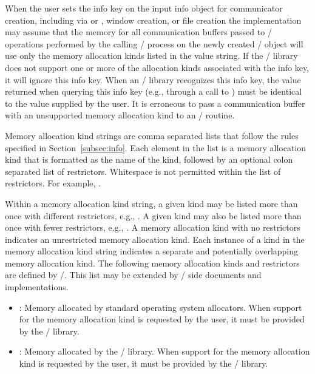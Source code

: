 When the user sets the  info key on
the input info object for communicator creation, including via
 or , window
creation, or file creation the implementation may assume that the memory for
all communication buffers passed to \MPI/ operations performed by the calling
\MPI/ process on the newly created \MPI/ object will use only the memory
allocation kinds listed in the value string.
%
If the \MPI/ library does not support one or more of the allocation kinds associated
with the  info key, it will ignore
this info key.
%
When an \MPI/ library recognizes this info key, the value returned when
querying this info key (e.g., through a call to )
must be identical to the value supplied by the user.
%
It is erroneous to pass a communication buffer with an unsupported memory allocation kind to
an \MPI/ routine.

Memory allocation kind strings are comma separated lists that follow the
rules specified in Section~\ref{subsec:info}. Each element in the list is a
memory allocation kind that is formatted as the name of the kind, followed by
an optional colon separated list of restrictors. Whitespace is not permitted within
the list of restrictors.
For example,
.

Within a memory allocation kind string, a given kind may be listed more than
once with different restrictors, e.g., .
A given kind may also be listed more than
once with fewer restrictors, e.g., .
A memory allocation kind with no restrictors indicates an unrestricted memory
allocation kind.
Each instance of a kind in the memory allocation kind string indicates a
separate and potentially overlapping memory allocation kind.
The following memory allocation kinds and restrictors are defined by \MPI/. This list may be extended by
\MPI/ side documents and implementations.

\begin{itemize}
    \item {}: Memory allocated by standard operating system allocators.
        When support for the  memory allocation kind is requested by the
        user, it must be provided by the \MPI/ library.
    \item {}: Memory allocated by the \MPI/ library.
        When support for the  memory allocation kind is requested by the
        user, it must be provided by the \MPI/ library.
\end{itemize}

